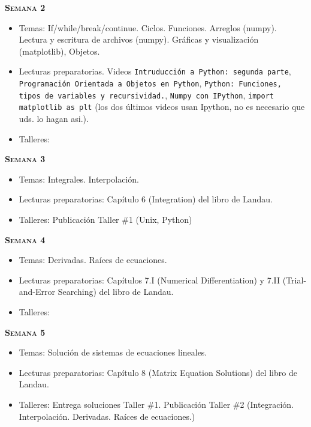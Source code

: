 \documentclass[letterpaper,10pt,onecolumn]{article}
\begin{document}
\noindent\textbf{\textsc{Semana 2}}\\[-0.5cm]
\begin{itemize}
\item Temas: If/while/break/continue. Ciclos. Funciones. Arreglos
(numpy). Lectura y escritura de archivos (numpy). Gr\'aficas y
visualizaci\'on (matplotlib), Objetos. \\[-0.6cm]
\item Lecturas preparatorias. Videos \texttt{Intruducci\'on a Python:
  segunda parte}, \texttt{Programaci\'on Orientada a Objetos en
  Python}, \texttt{Python: Funciones, tipos de
  variables y recursividad.}, \texttt{Numpy con IPython}, 
  \texttt{import matplotlib as plt} (los dos \'ultimos videos usan
  Ipython, no es necesario que uds. lo hagan asi.). \\[-0.6cm] 
\item Talleres: \\[-0.6cm]
\end{itemize}


\noindent\textbf{\textsc{Semana 3}}\\[-0.5cm]
\begin{itemize}
\item Temas: Integrales. Interpolaci\'on. \\[-0.6cm]
\item Lecturas preparatorias: Cap\'itulo 6 (Integration) del libro de
Landau.\\[-0.6cm]
\item Talleres: 
Publicaci\'on Taller \#1 (Unix, Python)\\[-0.6cm] 
\end{itemize}


\noindent\textbf{\textsc{Semana 4}}\\[-0.5cm]
\begin{itemize}
\item Temas: Derivadas. Ra\'ices de ecuaciones. \\[-0.6cm]
\item Lecturas preparatorias: Cap\'itulos 7.I (Numerical
  Differentiation) y 7.II (Trial-and-Error Searching) del libro de
  Landau.\\[-0.6cm] 
\item Talleres: \\[-0.6cm] 
\end{itemize}

\noindent\textbf{\textsc{Semana 5}}\\[-0.5cm]
\begin{itemize}
\item Temas: Soluci\'on de sistemas de ecuaciones lineales.\\[-0.6cm] 
\item Lecturas preparatorias:  Cap\'itulo 8 (Matrix Equation Solutions)
  del libro de Landau. \\[-0.6cm]
\item Talleres: 
Entrega soluciones Taller \#1.
Publicaci\'on Taller \#2
(Integraci\'on. Interpolaci\'on. Derivadas. Ra\'ices de ecuaciones.) 
\\[-0.6cm] 
\end{itemize}
\end{document}
